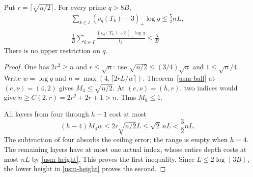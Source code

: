 \begin{theorem}\label{usm-budget}
Put \(r=\lceil\sqrt{n/2}\rceil\). For every prime \(q>8B\),
\begin{equation}\label{usm-five}
 \begin{gathered}
 \sum_{k\in I}(v_q(T_k)-3)_+\log q\leq\frac52 nL,\\
 \frac1B\sum_{k\in I}
       \frac{(v_q(T_k)-3)_+\log q}{t_k}\leq\frac5B .
 \end{gathered}
\end{equation}
There is no upper restriction on \(q\).
\end{theorem}
\begin{proof}
One has \(2r^2\geq n\) and \(r\leq\sqrt n\): use
\(\sqrt{n/2}\leq(3/4)\sqrt n\) and \(1\leq\sqrt n/4\).
Write \(w=\log q\) and \(h=\max(4,\lceil2rL/w\rceil)\).
Theorem~\ref{usm-ball} at \((e,\nu)=(4,2)\) gives
\(M_4\leq\sqrt{n/2}\). At \((e,\nu)=(h,r)\), two indices would
give \(n\geq C(2,r)=2r^2+2r+1>n\). Thus \(M_h\leq1\).

All layers from four through \(h-1\) cost at most
\[
 (h-4)M_4w\leq2r\sqrt{n/2}L
       \leq\sqrt2\,nL<\frac32 nL .
\]
The subtraction of four absorbs the ceiling error; the range is
empty when \(h=4\). The remaining layers have at most one actual
index, whose entire depth costs at most \(nL\) by
\eqref{usm-height}. This proves the first inequality.
Since \(L\leq2\log(3B)\), the lower height in
\eqref{usm-height} proves the second.
\end{proof}

